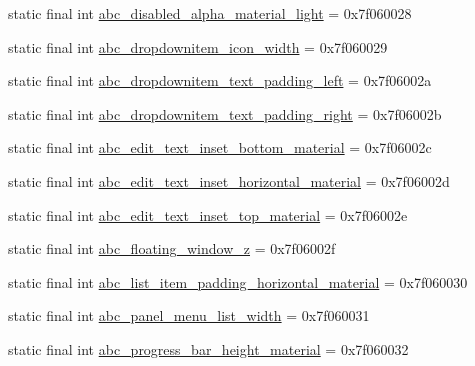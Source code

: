 \begin{DoxyCompactItemize}
\item 
static final int \mbox{\hyperlink{classandroid_1_1support_1_1v7_1_1appcompat_1_1_r_1_1dimen_a28eacd87805e60b3350cf55e7e60ff05}{abc\+\_\+disabled\+\_\+alpha\+\_\+material\+\_\+light}} = 0x7f060028
\item 
static final int \mbox{\hyperlink{classandroid_1_1support_1_1v7_1_1appcompat_1_1_r_1_1dimen_ac3283f5b742838d313ac74aa12c129ca}{abc\+\_\+dropdownitem\+\_\+icon\+\_\+width}} = 0x7f060029
\item 
static final int \mbox{\hyperlink{classandroid_1_1support_1_1v7_1_1appcompat_1_1_r_1_1dimen_ab4f69e00dfa34a3c6f6a34a4f39275f8}{abc\+\_\+dropdownitem\+\_\+text\+\_\+padding\+\_\+left}} = 0x7f06002a
\item 
static final int \mbox{\hyperlink{classandroid_1_1support_1_1v7_1_1appcompat_1_1_r_1_1dimen_ad783efb42893731cf1f7f809ba1c0d5b}{abc\+\_\+dropdownitem\+\_\+text\+\_\+padding\+\_\+right}} = 0x7f06002b
\item 
static final int \mbox{\hyperlink{classandroid_1_1support_1_1v7_1_1appcompat_1_1_r_1_1dimen_ad747a841e96560a696e4012d696d2ac1}{abc\+\_\+edit\+\_\+text\+\_\+inset\+\_\+bottom\+\_\+material}} = 0x7f06002c
\item 
static final int \mbox{\hyperlink{classandroid_1_1support_1_1v7_1_1appcompat_1_1_r_1_1dimen_ae52f73ef5d27d41b72d8a3e2cc9d2b5a}{abc\+\_\+edit\+\_\+text\+\_\+inset\+\_\+horizontal\+\_\+material}} = 0x7f06002d
\item 
static final int \mbox{\hyperlink{classandroid_1_1support_1_1v7_1_1appcompat_1_1_r_1_1dimen_a8f3a30511f3e727e28bf89d5a1bbc5d3}{abc\+\_\+edit\+\_\+text\+\_\+inset\+\_\+top\+\_\+material}} = 0x7f06002e
\item 
static final int \mbox{\hyperlink{classandroid_1_1support_1_1v7_1_1appcompat_1_1_r_1_1dimen_a69393494aeb17e1317ac34e42fc20862}{abc\+\_\+floating\+\_\+window\+\_\+z}} = 0x7f06002f
\item 
static final int \mbox{\hyperlink{classandroid_1_1support_1_1v7_1_1appcompat_1_1_r_1_1dimen_a413d6f0f1c60575b7369e9e448283c02}{abc\+\_\+list\+\_\+item\+\_\+padding\+\_\+horizontal\+\_\+material}} = 0x7f060030
\item 
static final int \mbox{\hyperlink{classandroid_1_1support_1_1v7_1_1appcompat_1_1_r_1_1dimen_ac1eb537985c0762039ad7dfc84d7a94f}{abc\+\_\+panel\+\_\+menu\+\_\+list\+\_\+width}} = 0x7f060031
\item 
static final int \mbox{\hyperlink{classandroid_1_1support_1_1v7_1_1appcompat_1_1_r_1_1dimen_a365c3d062a342b9950c6dca70badd6fd}{abc\+\_\+progress\+\_\+bar\+\_\+height\+\_\+material}} = 0x7f060032

\end{DoxyCompactItemize}
